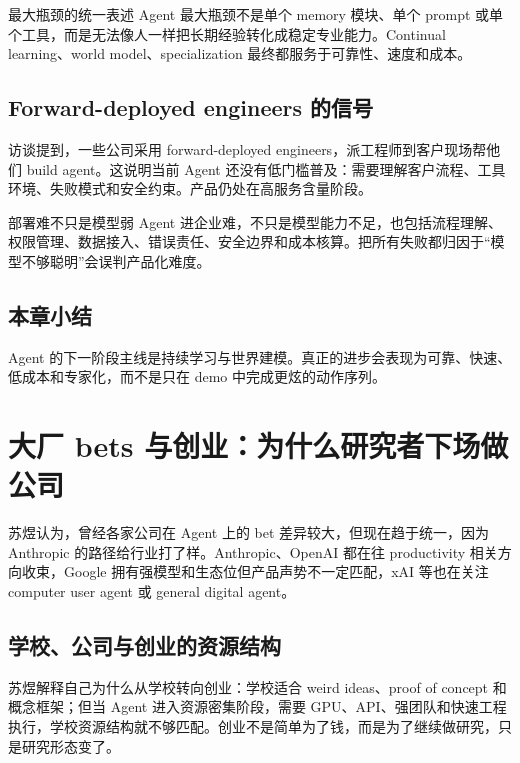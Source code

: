 \documentclass[a4paper]{article}
\begin{document}
\begin{importantbox}{最大瓶颈的统一表述}
Agent 最大瓶颈不是单个 memory 模块、单个 prompt 或单个工具，而是无法像人一样把长期经验转化成稳定专业能力。Continual learning、world model、specialization 最终都服务于可靠性、速度和成本。
\end{importantbox}

\subsection{Forward-deployed engineers 的信号}

访谈提到，一些公司采用 forward-deployed engineers，派工程师到客户现场帮他们 build agent。这说明当前 Agent 还没有低门槛普及：需要理解客户流程、工具环境、失败模式和安全约束。产品仍处在高服务含量阶段。

\begin{warningbox}{部署难不只是模型弱}
Agent 进企业难，不只是模型能力不足，也包括流程理解、权限管理、数据接入、错误责任、安全边界和成本核算。把所有失败都归因于“模型不够聪明”会误判产品化难度。
\end{warningbox}

\subsection{本章小结}

Agent 的下一阶段主线是持续学习与世界建模。真正的进步会表现为可靠、快速、低成本和专家化，而不是只在 demo 中完成更炫的动作序列。

\section{大厂 bets 与创业：为什么研究者下场做公司}

苏煜认为，曾经各家公司在 Agent 上的 bet 差异较大，但现在趋于统一，因为 Anthropic 的路径给行业打了样。Anthropic、OpenAI 都在往 productivity 相关方向收束，Google 拥有强模型和生态位但产品声势不一定匹配，xAI 等也在关注 computer user agent 或 general digital agent。




\subsection{学校、公司与创业的资源结构}

苏煜解释自己为什么从学校转向创业：学校适合 weird ideas、proof of concept 和概念框架；但当 Agent 进入资源密集阶段，需要 GPU、API、强团队和快速工程执行，学校资源结构就不够匹配。创业不是简单为了钱，而是为了继续做研究，只是研究形态变了。
\end{document}
